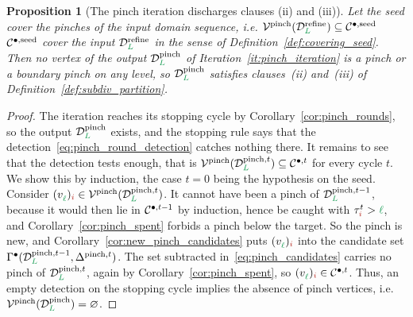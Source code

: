 \documentclass[a4paper, 12pt]{article}
\makeatletter
\newcommand{\robert}[1]{{\color{orange} #1}}
\newcommand{\collectV}{\Gamma^{\bullet}}                         %
\DeclareRobustCommand{\candV}[1][]{\mathcal{C}^{\bullet\ifx\@empty#1\@empty\else,#1\fi}}
\newcommand{\targetlevel}{\tau}                                 %
\newcommand{\green}{\color{ForestGreen}}
\newcommand{\brickred}{\color{BrickRed}}
\newcommand{\V}{\mathcal{V}}
\DeclareRobustCommand{\simplexsubsetTwo}[2][]{\Delta\ifx\@empty#1\@empty\else^{#1}\fi_{#2}}
\newcommand{\vertex}[2]{\freeQ{v}{}{#1}{#2}}
\newcommand{\coarseIdxone}{{\brickred i}}
\renewcommand{\l}{{\green\ell}}
\renewcommand{\L}{{\green L}}
\newcommand{\freeQ}[4]{ ( {#1}^{#2}_{#3} )_{#4}}
\newtheorem{proposition}[theorem]{Proposition}
\theoremstyle{definition}
\theoremstyle{plain}
\numberwithin{equation}{section}
\newcommand{\tobecut}[1]{{\color{red} #1}}     %
\DeclareRobustCommand{\domseq}[1][]{\mathcal{D}\ifx\@empty#1\@empty\else_{#1}\fi}
\makeatother
\begin{document}
\begin{proposition}[The pinch iteration discharges clauses (ii) and (iii)]
    \label{prop:pinch_discharged}
    Let the seed \tobecut{cover the pinches of the input domain sequence, i.e. $\V^{\mathrm{pinch}}(\domseq[\L]^{\mathrm{refine}}) \subseteq \candV[\mathrm{seed}]$}\robert{$\candV[\mathrm{seed}]$ cover the input $\domseq[\L]^{\mathrm{refine}}$ in the sense of Definition~\ref{def:covering_seed}}. Then no vertex of the output $\domseq[\L]^{\mathrm{pinch}}$ of Iteration~\ref{it:pinch_iteration} is a pinch or a boundary pinch on any level, so $\domseq[\L]^{\mathrm{pinch}}$ satisfies clauses~(ii) and~(iii) of Definition~\ref{def:subdiv_partition}.
\end{proposition}
\begin{proof}
    The iteration reaches its stopping cycle by Corollary~\ref{cor:pinch_rounds}, so the output $\domseq[\L]^{\mathrm{pinch}}$ exists, and the stopping rule says that the detection~\eqref{eq:pinch_round_detection} catches nothing there. It remains to see that the detection tests enough, that is $\V^{\mathrm{pinch}}(\domseq[\L]^{\mathrm{pinch},t}) \subseteq \candV[t]$ for every cycle $t$. We show this by induction, the case $t = 0$ being the hypothesis on the seed. Consider $\vertex{\l}{\coarseIdxone} \in \V^{\mathrm{pinch}}(\domseq[\L]^{\mathrm{pinch},t})$. It cannot have been a pinch of $\domseq[\L]^{\mathrm{pinch},t-1}$, because it would then lie in $\candV[t-1]$ by induction, hence be caught with $\targetlevel^t_\coarseIdxone > \l$, and Corollary~\ref{cor:pinch_spent} forbids a pinch below the target. So the pinch is new, and Corollary~\ref{cor:new_pinch_candidates} puts $\vertex{\l}{\coarseIdxone}$ into the candidate set $\collectV(\domseq[\L]^{\mathrm{pinch},t-1}, \simplexsubsetTwo[\mathrm{pinch},t]{})$. The set subtracted in~\eqref{eq:pinch_candidates} carries no pinch of $\domseq[\L]^{\mathrm{pinch},t}$, again by Corollary~\ref{cor:pinch_spent}, so $\vertex{\l}{\coarseIdxone} \in \candV[t]$. Thus, an empty detection on the stopping cycle implies the absence of pinch vertices, i.e. $\V^{\mathrm{pinch}}(\domseq[\L]^{\mathrm{pinch}}) = \varnothing$.
\end{proof}
\end{document}
